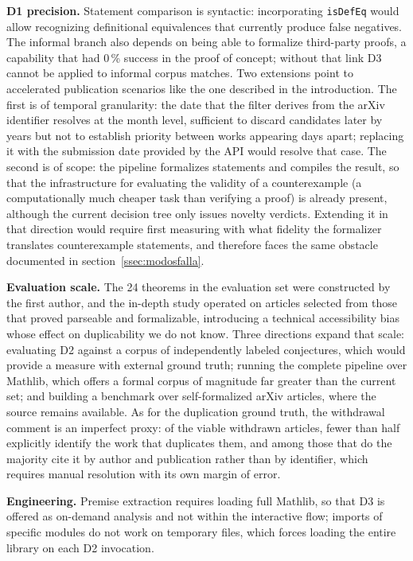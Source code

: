 \documentclass[12pt,a4paper]{article}
\theoremstyle{remark}
\begin{document}
\textbf{D1 precision.} Statement comparison is syntactic: incorporating \texttt{isDefEq} would allow recognizing definitional equivalences that currently produce false negatives. The informal branch also depends on being able to formalize third-party proofs, a capability that had 0\,\% success in the proof of concept; without that link D3 cannot be applied to informal corpus matches.
Two extensions point to accelerated publication scenarios like the one described in the introduction. The first is of temporal granularity: the date that the filter derives from the arXiv identifier resolves at the month level, sufficient to discard candidates later by years but not to establish priority between works appearing days apart; replacing it with the submission date provided by the API would resolve that case. The second is of scope: the pipeline formalizes statements and compiles the result, so that the infrastructure for evaluating the validity of a counterexample (a computationally much cheaper task than verifying a proof) is already present, although the current decision tree only issues novelty verdicts. Extending it in that direction would require first measuring with what fidelity the formalizer translates counterexample statements, and therefore faces the same obstacle documented in section~\ref{ssec:modosfalla}.

\textbf{Evaluation scale.} The 24 theorems in the evaluation set were constructed by the first author, and the in-depth study operated on articles selected from those that proved parseable and formalizable, introducing a technical accessibility bias whose effect on duplicability we do not know. Three directions expand that scale: evaluating D2 against a corpus of independently labeled conjectures, which would provide a measure with external ground truth; running the complete pipeline over Mathlib, which offers a formal corpus of magnitude far greater than the current set; and building a benchmark over self-formalized arXiv articles, where the source remains available. As for the duplication ground truth, the withdrawal comment is an imperfect proxy: of the viable withdrawn articles, fewer than half explicitly identify the work that duplicates them, and among those that do the majority cite it by author and publication rather than by identifier, which requires manual resolution with its own margin of error.

\textbf{Engineering.} Premise extraction requires loading full Mathlib, so that D3 is offered as on-demand analysis and not within the interactive flow; imports of specific modules do not work on temporary files, which forces loading the entire library on each D2 invocation.
\end{document}

